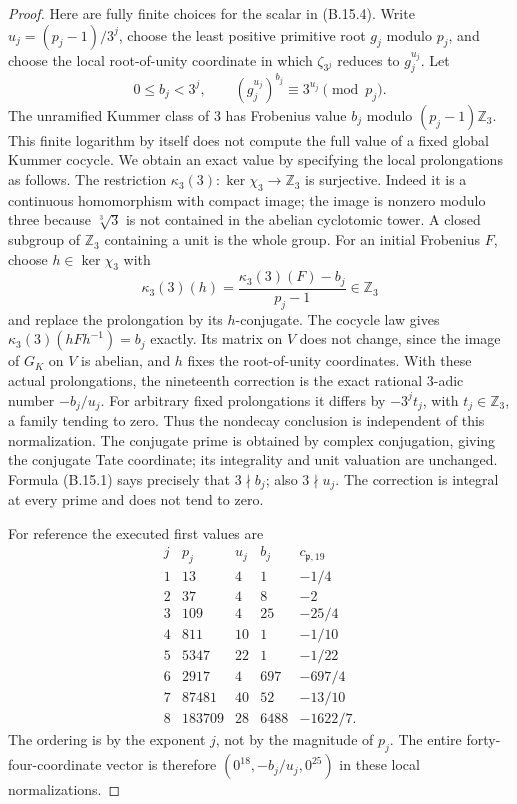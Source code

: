 \begin{proof}
Here are fully finite choices for the scalar in (B.15.4). Write
$u_j=(p_j-1)/3^j$, choose the least positive primitive root $g_j$
modulo $p_j$, and choose the local root-of-unity coordinate in
which $\zeta_{3^j}$ reduces to $g_j^{u_j}$. Let
\[
 0\leq b_j<3^j,\qquad
        (g_j^{u_j})^{b_j}\equiv3^{u_j}\pmod{p_j}.                 \tag{B.15.5}
\]
The unramified Kummer class of $3$ has Frobenius value $b_j$
modulo $(p_j-1)\mathbb Z_3$. This finite logarithm by itself
does not compute the full value of a fixed global Kummer
cocycle. We obtain an exact value by specifying the local
prolongations as follows. The restriction
$\kappa_3(3):\ker\chi_3\to\mathbb Z_3$ is surjective. Indeed
it is a continuous homomorphism with compact image; the image
is nonzero modulo three because $\sqrt[3]{3}$ is not contained
in the abelian cyclotomic tower. A closed subgroup of
$\mathbb Z_3$ containing a unit is the whole group.
For an initial Frobenius $F$, choose $h\in\ker\chi_3$ with
\[
 \kappa_3(3)(h)=
       \frac{\kappa_3(3)(F)-b_j}{p_j-1}\in\mathbb Z_3
\]
and replace the prolongation by its $h$-conjugate. The cocycle
law gives
$\kappa_3(3)(hFh^{-1})=b_j$ exactly. Its matrix on $V$ does
not change, since the image of $G_K$ on $V$ is abelian, and
$h$ fixes the root-of-unity coordinates. With these actual
prolongations, the nineteenth correction is the exact rational
$3$-adic number $-b_j/u_j$.
For arbitrary fixed prolongations it differs by $-3^jt_j$,
with $t_j\in\mathbb Z_3$, a family tending to zero. Thus the
nondecay conclusion is independent of this normalization.
The conjugate prime is obtained by complex conjugation, giving
the conjugate Tate coordinate; its integrality and unit valuation
are unchanged. Formula (B.15.1) says precisely that $3\nmid b_j$;
also $3\nmid u_j$. The correction is integral at every prime and
does not tend to zero.

For reference the executed first values are
\[
\begin{array}{c|r|r|r|r}
 j&p_j&u_j&b_j&c_{\mathfrak p,19}\\\hline
 1&13&4&1&-1/4\\
 2&37&4&8&-2\\
 3&109&4&25&-25/4\\
 4&811&10&1&-1/10\\
 5&5347&22&1&-1/22\\
 6&2917&4&697&-697/4\\
 7&87481&40&52&-13/10\\
 8&183709&28&6488&-1622/7.
\end{array}
\]
The ordering is by the exponent $j$, not by the magnitude of
$p_j$. The entire forty-four-coordinate vector is therefore
$(0^{18},-b_j/u_j,0^{25})$ in these local normalizations.


\end{proof}
